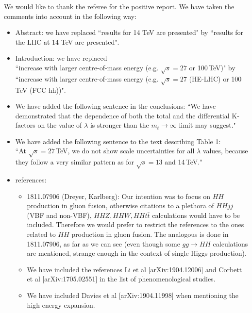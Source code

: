 \documentclass[]{article}
\begin{document}
We would like to thank the referee for the positive report.
We have taken the comments into account in the following way:

\begin{itemize}
\item  Abstract: we have replaced ``results for 14 TeV are presented" by ``results for the LHC at 14 TeV are presented".

\item Introduction: we have replaced\\
 ``increase with larger centre-of-mass energy (e.g. $\sqrt{s}=27$ or
 100\,TeV)" by \\
``increase with larger centre-of-mass energy (e.g. $\sqrt{s}=27$ (HE-LHC) or 100\,TeV (FCC-hh))".

\item We have added the following sentence in the conclusions:
``We have demonstrated that the dependence of both the total and the
differential K-factors on the value of $\lambda$ is stronger than the $m_t\to\infty$ limit may suggest."

\item We have added the following sentence to the text describing Table 1:\\
``At $\sqrt{s}=27$\,TeV, we do not show scale uncertainties for all $\lambda$ values,  because they follow a very similar pattern as for $\sqrt{s}=13$ and 14\,TeV."


\item references: 
\begin{itemize}
\item
1811.07906 (Dreyer, Karlberg): 
Our intention was to focus on $HH$ production in gluon fusion, otherwise citations to a plethora of
$HHjj$ (VBF and non-VBF), $HHZ,HHW, HHt\bar{t}$ calculations would have to be included.  
Therefore we would prefer to restrict the references to the ones
related to $HH$ production in gluon fusion.
The analogous is done in 1811.07906, as far as we can see (even though
some $gg\to HH$ calculations are mentioned, strange enough in the context of
single Higgs production). 

\item We have included the references Li et al [arXiv:1904.12006] and Corbett et al [arXiv:1705.02551] in the list of phenomenological studies.

\item We have included Davies et al [arXiv:1904.11998] when mentioning the high energy expansion.

\end{itemize}
\end{itemize}
\end{document}
